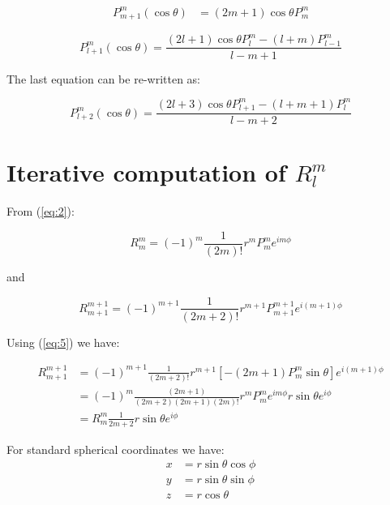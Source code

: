 \documentclass{article}
\begin{document}
\begin{equation} \label{eq:6}
  \begin{split}
    P^m_{m+1}(\cos{\theta}) & = (2m+1) \cos{\theta} P^m_m
  \end{split}
\end{equation}

\begin{equation} \label{eq:7}
  P^m_{l+1}(\cos{\theta}) = \frac{(2l+1)\cos{\theta}P^m_l - (l+m)P^m_{l-1}}{l-m+1}
\end{equation}

The last equation can be re-written as:

\begin{equation} \label{eq:8}
  P^m_{l+2}(\cos{\theta}) = \frac{(2l+3)\cos{\theta}P^m_{l+1} - (l+m+1)P^m_{l}}{l-m+2}
\end{equation}

\section{Iterative computation of $R^m_l$}

From (\ref{eq:2}):

\begin{equation}
  R^{m}_{m} = (-1)^{m} \frac{1}{(2m)!} r^m P^m_m e^{i m \phi}
\end{equation}

and

\begin{equation}
  R^{m+1}_{m+1} = (-1)^{m+1} \frac{1}{(2m+2)!} r^{m+1} P^{m+1}_{m+1} e^{i (m+1) \phi}
\end{equation}

Using (\ref{eq:5}) we have:

\begin{equation}
  \begin{split}
    R^{m+1}_{m+1} & = (-1)^{m+1} \frac{1}{(2m+2)!} r^{m+1} [-(2m+1) P^{m}_{m} \sin{\theta}] e^{i (m+1) \phi} \\
    & = (-1)^m \frac{(2m+1)}{(2m+2)(2m+1)(2m)!} r^m P^m_m e^{im\phi} r \sin{\theta} e^{i\phi} \\
    & = R^m_m \frac{1}{2m+2} r \sin{\theta} e^{i\phi}
  \end{split}
\end{equation}

For standard spherical coordinates we have:
\begin{equation}
\begin{split}
  x & = r \sin{\theta} \cos{\phi} \\
  y & = r \sin{\theta} \sin{\phi} \\
  z & = r \cos{\theta}
\end{split}
\end{equation}
\end{document}
